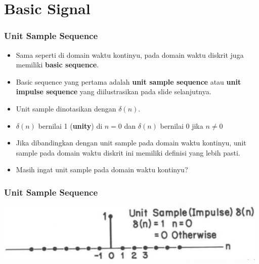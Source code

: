 \documentclass[pdflatex,compress]{beamer}
\begin{document}
\section{Basic Signal}
\begin{frame}
	\frametitle{Unit Sample Sequence}
	\begin{itemize}
		\item Sama seperti di domain waktu kontinyu, pada domain waktu diskrit juga memiliki \textbf{basic sequence}.
		\item Basic sequence yang pertama adalah \textbf{unit sample sequence} atau \textbf{unit impulse sequence} yang diilustrasikan pada slide selanjutnya.
		\item Unit sample dinotasikan dengan $ \delta(n) $.
		\item $ \delta(n) $ bernilai 1 (\textbf{unity}) di $ n = 0 $ dan $ \delta(n) $ bernilai 0 jika $n \neq 0$ 
		\item Jika dibandingkan dengan unit sample pada domain waktu kontinyu, unit sample pada domain waktu diskrit ini memiliki definisi yang lebih pasti.
		\item Masih ingat unit sample pada domain waktu kontinyu?
	\end{itemize}
\end{frame}

\begin{frame}
	\frametitle{Unit Sample Sequence}
	\begin{center}
		\includegraphics[width=\linewidth]{img/img002}
	\end{center}
\end{frame}
\end{document}
